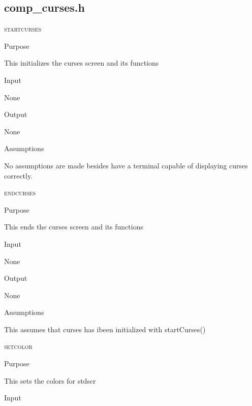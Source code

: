 \documentclass[pdftex, 11pt]{article}
\begin{document}
\subsection{comp\_curses.h}
\begin{description}

	\item{\textsc{startcurses}}
		\begin{description}
			\item{Purpose}

				This initializes the curses screen and its functions

			\item{Input}

				None

			\item{Output}

				None

			\item{Assumptions}

				No assumptions are made besides have a terminal
				capable of displaying curses correctly.

		\end{description}


	\item{\textsc{endcurses}}
		\begin{description}
			\item{Purpose}

				This ends the curses screen and its functions

			\item{Input}

				None

			\item{Output}

				None

			\item{Assumptions}

				This assumes that curses has ibeen initialized
				with startCurses()


		\end{description}


	\item{\textsc{setcolor}}
		\begin{description}
			\item{Purpose}

				This sets the colors for stdscr

			\item{Input}

				\begin{itemize}


\end{itemize}
\end{description}
\end{description}
\end{document}
